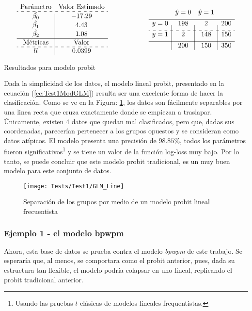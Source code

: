 \documentclass[../Main/Main.tex]{subfiles}
\begin{document}
\begin{table}[h]
\begin{align*}
\begin{array}{c|c}
\text{Parámetro} &\text{Valor Estimado} \\
\hdashline
\hat{\beta_0} & -17.29 \\
\hat{\beta_1} & 4.43 \\
\hat{\beta_2} & 1.08 \\
\hline
\text{Métricas} & \text{Valor} \\
\hdashline
ll & 0.0399
\end{array}
\qquad\qquad\qquad
\matconf{198}{2}{200}{2}{148}{150}{200}{150}{350}
\end{align*}
\caption{Resultados para modelo probit}
\label{tab:Test0}
\end{table}

Dada la simplicidad de los datos, el modelo lineal probit, presentado en la ecuación (\ref{ec:Test1ModGLM}) resulta ser una excelente forma de hacer la clasificación. Como se ve en la Figura: \ref{fig:Test0ModGLM}, los datos son fácilmente separables por una linea recta que cruza exactamente donde se empiezan a traslapar. Únicamente, existen 4 datos que quedan mal clasificados, pero que, dadas sus coordenadas, parecerían pertenecer a los grupos opuestos y se consideran como datos atípicos. El modelo presenta una precisión de $98.85\%$, todos los parámetros fueron significativos\footnote{Usando las pruebas $t$ clásicas de modelos lineales frequentistas.} y se tiene un valor de la función log-loss muy bajo. Por lo tanto, se puede concluir que este modelo probit tradicional, es un muy buen modelo para este conjunto de datos. 
\begin{figure}[h]
  \centering
      \texttt{[image: Tests/Test1/GLM\_Line]}
  \caption{Separación de los grupos por medio de un modelo probit lineal frecuentista}
 \label{fig:Test0ModGLM}
\end{figure}

\subsubsection*{Ejemplo 1 - el modelo bpwpm} \label{sec:Test1Ej1}
Ahora, esta base de datos se prueba contra el modelo \textit{bpwpm} de este trabajo. Se esperaría que, al menos, se comportara como el probit anterior, pues, dada su estructura tan flexible, el modelo podría colapsar en uno lineal, replicando el probit tradicional anterior. 
\end{document}
